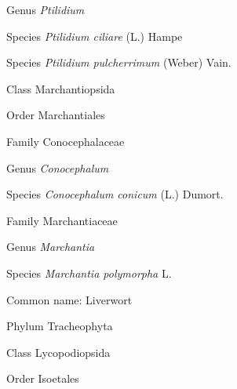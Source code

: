 \documentclass[9pt, article]{memoir}
\begin{document}
\begin{multicols}{2}
\vspace{6pt}\noindent\hspace{30pt}Genus \textit{Ptilidium}


\vspace{6pt}\noindent\hspace{36pt}Species \textit{Ptilidium ciliare} (L.) Hampe


\vspace{6pt}\noindent\hspace{36pt}Species \textit{Ptilidium pulcherrimum} (Weber) Vain.


\vspace{6pt}\noindent\hspace{12pt}Class Marchantiopsida


\vspace{6pt}\noindent\hspace{18pt}Order Marchantiales


\vspace{6pt}\noindent\hspace{24pt}Family Conocephalaceae


\vspace{6pt}\noindent\hspace{30pt}Genus \textit{Conocephalum}


\vspace{6pt}\noindent\hspace{36pt}Species \textit{Conocephalum conicum} (L.) Dumort.


\vspace{6pt}\noindent\hspace{24pt}Family Marchantiaceae


\vspace{6pt}\noindent\hspace{30pt}Genus \textit{Marchantia}


\vspace{6pt}\noindent\hspace{36pt}Species \textit{Marchantia polymorpha} L.


Common name: Liverwort

\vspace{6pt}\noindent\hspace{6pt}Phylum Tracheophyta


\vspace{6pt}\noindent\hspace{12pt}Class Lycopodiopsida


\vspace{6pt}\noindent\hspace{18pt}Order Isoetales



\end{multicols}
\end{document}

